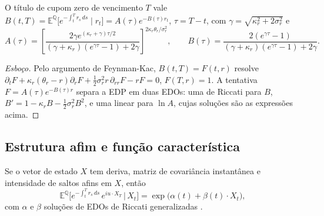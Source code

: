 \begin{proposicao}\label{prop:cir-bond}
O título de cupom zero de vencimento $T$ vale $B(t,T)=\mathbb E^{\mathbb Q}\big[e^{-\int_t^Tr_s\,ds}\mid r_t\big]=A(\tau)e^{-B(\tau)r_t}$, $\tau=T-t$, com $\gamma=\sqrt{\kappa_r^2+2\sigma_r^2}$ e
\begin{equation}
A(\tau)=\left[\frac{2\gamma e^{(\kappa_r+\gamma)\tau/2}}{(\gamma+\kappa_r)(e^{\gamma\tau}-1)+2\gamma}\right]^{2\kappa_r\theta_r/\sigma_r^2},\qquad B(\tau)=\frac{2(e^{\gamma\tau}-1)}{(\gamma+\kappa_r)(e^{\gamma\tau}-1)+2\gamma}.
\end{equation}
\end{proposicao}

\begin{proof}[Esboço]
Pelo argumento de Feynman-Kac, $B(t,T)=F(t,r)$ resolve $\partial_tF+\kappa_r(\theta_r-r)\partial_rF+\tfrac12\sigma_r^2r\,\partial_{rr}F-rF=0$, $F(T,r)=1$. A tentativa $F=A(\tau)e^{-B(\tau)r}$ separa a EDP em duas EDOs: uma de Riccati para $B$, $B'=1-\kappa_rB-\tfrac12\sigma_r^2B^2$, e uma linear para $\ln A$, cujas soluções são as expressões acima.
\end{proof}

\subsection{Estrutura afim e função característica}

\begin{teorema}
Se o vetor de estado $X$ tem deriva, matriz de covariância instantânea e intensidade de saltos afins em $X$, então
\begin{equation}
\mathbb E^{\mathbb Q}\big[e^{-\int_t^Tr_s\,ds}\,e^{iu\cdot X_T}\,\big|\,X_t\big]=\exp\big(\alpha(t)+\beta(t)\cdot X_t\big),
\end{equation}
com $\alpha$ e $\beta$ soluções de EDOs de Riccati generalizadas \citep{duffiepansingleton2000}.
\end{teorema}

